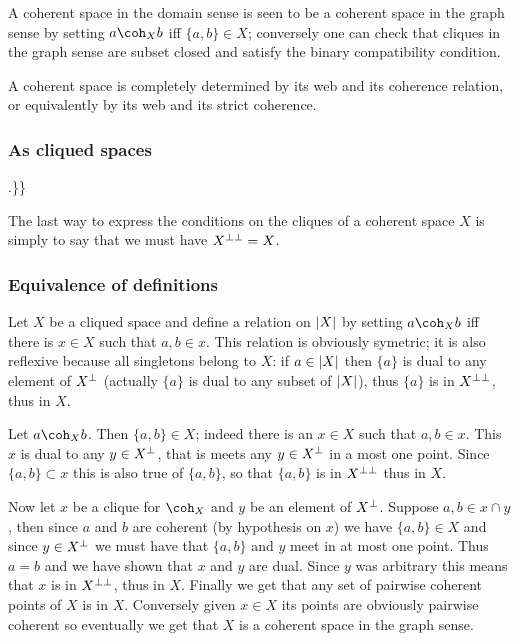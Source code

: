 A coherent space in the domain sense is seen to be a coherent space in
the graph sense by setting \(a\coh_X b\) iff \(\{a,b\}\in X\);
conversely one can check that cliques in the graph sense are subset
closed and satisfy the binary compatibility condition.

A coherent space is completely determined by its web and its coherence
relation, or equivalently by its web and its strict coherence.

\subsubsection{As cliqued spaces}\label{as-cliqued-spaces}

.\}\}

The last way to express the conditions on the cliques of a coherent
space \(X\) is simply to say that we must have \(X^{\bot\bot} = X\).

\subsubsection{Equivalence of definitions}\label{equivalence-of-definitions}

Let \(X\) be a cliqued space and define a relation on \(\left|X\right|\) by
setting \(a\coh_X b\) iff there is \(x\in X\) such that \(a, b\in x\).
This relation is obviously symetric; it is also reflexive because all
singletons belong to \(X\): if \(a\in \left|X\right|\) then \(\{a\}\) is dual to
any element of \(X^\bot\) (actually \(\{a\}\) is dual to any subset of
\(\left|X\right|\)), thus \(\{a\}\) is in \(X^{\bot\bot}\), thus in \(X\).

Let \(a\coh_X b\). Then \(\{a,b\}\in X\); indeed there is an \(x\in X\)
such that \(a, b\in x\). This \(x\) is dual to any \(y\in X^\bot\), that
is meets any \(y\in X^\bot\) in a most one point. Since
\(\{a,b\}\subset x\) this is also true of \(\{a,b\}\), so that
\(\{a,b\}\) is in \(X^{\bot\bot}\) thus in \(X\).

Now let \(x\) be a clique for \(\coh_X\) and \(y\) be an element of
\(X^\bot\). Suppose \(a, b\in x\cap y\), then since \(a\) and \(b\) are
coherent (by hypothesis on \(x\)) we have \(\{a,b\}\in X\) and since
\(y\in X^\bot\) we must have that \(\{a,b\}\) and \(y\) meet in at most
one point. Thus \(a = b\) and we have shown that \(x\) and \(y\) are
dual. Since \(y\) was arbitrary this means that \(x\) is in
\(X^{\bot\bot}\), thus in \(X\). Finally we get that any set of pairwise
coherent points of \(X\) is in \(X\). Conversely given \(x\in X\) its
points are obviously pairwise coherent so eventually we get that \(X\)
is a coherent space in the graph sense.

